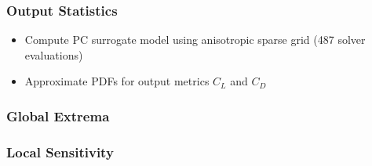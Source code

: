 \documentclass[9pt]{beamer}
\begin{document}
\begin{frame}
\frametitle{Output Statistics}
\label{sec-4-4}

\vspace*{-0.0cm}\begin{figure}
\end{figure}
\begin{itemize}
\item Compute PC surrogate model using anisotropic sparse grid (487 solver
  evaluations)
\item Approximate PDFs for output metrics $C_L$ and $C_D$
\end{itemize}
\end{frame}
\begin{frame}
\frametitle{Global Extrema}
\label{sec-4-5}
\end{frame}
\begin{frame}
\frametitle{Local Sensitivity}
\label{sec-4-6}
\end{frame}
\end{document}
